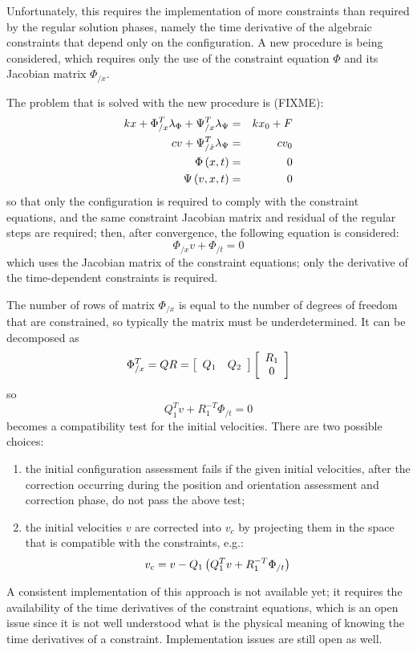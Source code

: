 \documentclass[10pt,dvips]{report}
\begin{document}
Unfortunately, this requires the implementation of more constraints
than required by the regular solution phases, namely the time derivative
of the algebraic constraints that depend only on the configuration.
A new procedure is being considered, which requires only the use 
of the constraint equation $\Phi$ and its Jacobian matrix $\Phi_{/x}$.

The problem that is solved with the new procedure is (FIXME):
\begin{eqnarray*}
	k x + \Phi_{/x}^T \lambda_{\Phi} + \Psi_{/x}^T \lambda_{\Psi} 
		& = & k x_0 + F \\
	c v + \Psi_{/\dot{x}}^T \lambda_{\Psi} & = & c v_0 \\
	\Phi\plbr{x, t} & = & 0 \\
	\Psi\plbr{v, x, t} & = & 0
\end{eqnarray*}
so that only the configuration is required to comply 
with the constraint equations, and the same constraint 
Jacobian matrix and residual of the regular steps are required;
then, after convergence, the following equation is considered:
\begin{displaymath}
	\Phi_{/x} v + \Phi_{/t} = 0
\end{displaymath}
which uses the Jacobian matrix of the constraint equations; 
only the derivative of the time-dependent constraints is required.

The number of rows of matrix $\Phi_{/x}$ is equal to the number 
of degrees of freedom that are constrained, so typically the matrix 
must be underdetermined.
It can be decomposed as
\begin{displaymath}
	\Phi_{/x}^T = Q R
		= \sqbr{\matr{cc}{Q_1 & Q_2}}\sqbr{\cvvect{R_1 \\ 0}}
\end{displaymath}
so
\begin{displaymath}
	Q_1^T v + R_1^{-T} \Phi_{/t} = 0
\end{displaymath}
becomes a compatibility test for the initial velocities.
There are two possible choices:
\begin{enumerate}
\item the initial configuration assessment fails if the given 
initial velocities, after the correction occurring during the position 
and orientation assessment and correction phase, do not pass 
the above test;
\item the initial velocities $v$ are corrected into $v_c$ 
by projecting them in the space that is compatible with the constraints, 
e.g.:
\begin{displaymath}
	v_c = v - Q_1 \plbr{Q_1^T v + R_1^{-T}\Phi_{/t}}
\end{displaymath}
\end{enumerate}
A consistent implementation of this approach is not available yet;
it requires the availability of the time derivatives 
of the constraint equations, which is an open issue since it is not
well understood what is the physical meaning of knowing 
the time derivatives of a constraint.
Implementation issues are still open as well.
\end{document}
